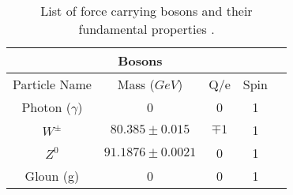 \begin{table}[!htb]
  \centering
  \begin{tabular}{|c|c|c|c|c|}
  \hline
  \multicolumn{4}{|c|}{Bosons} \\
  \hline
   Particle Name & Mass ($GeV$) &     Q/e & Spin \\
  \hline
  \hline
  Photon ($\gamma$) &                  0 &       0 &    1 \\
  \hline
  $W^\pm$           & $80.385 \pm 0.015$ & $\mp 1$ &    1 \\
  $Z^0$             & $91.1876\pm0.0021$ &       0 &    1 \\
  \hline
  Gloun (g)         &                  0 &       0 &    1 \\
  \hline
  \end{tabular}
  \caption[List of bosons and their fundamental properties]{List of force carrying bosons and their fundamental properties \cite{ARTICLE:PDG2014}.}
  \label{TABLE:Theory_SM_ParticlesAndForces_BosonProperties}
\end{table}

